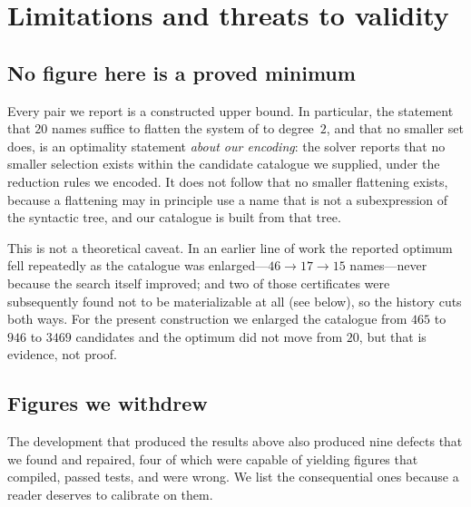 \section{Limitations and threats to validity}
\label{sec:limits}

\subsection{No figure here is a proved minimum}

Every pair we report is a constructed upper bound. In particular, the
statement that $20$ names suffice to flatten the system of \cite{jsww1976} to
degree~$2$, and that no smaller set does, is an optimality statement
\emph{about our encoding}: the solver reports that no smaller selection exists
within the candidate catalogue we supplied, under the reduction rules we
encoded. It does not follow that no smaller flattening exists, because a
flattening may in principle use a name that is not a subexpression of the
syntactic tree, and our catalogue is built from that tree.

This is not a theoretical caveat. In an earlier line of work the reported
optimum fell repeatedly as the catalogue was enlarged---$46\to17\to15$
names---never because the search itself improved; and two of those certificates
were subsequently found not to be materializable at all (see below), so the
history cuts both ways. For the present construction we enlarged the catalogue
from $465$ to $946$ to $3469$ candidates and the optimum did not move from
$20$, but that is evidence, not proof.

\subsection{Figures we withdrew}

The development that produced the results above also produced nine defects that
we found and repaired, four of which were capable of yielding figures that
compiled, passed tests, and were wrong. We list the consequential ones because
a reader deserves to calibrate on them.


